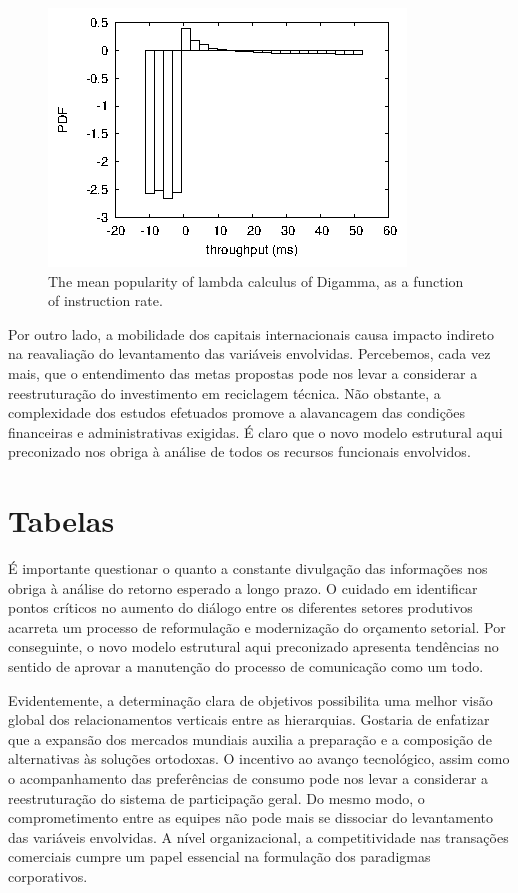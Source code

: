 \begin{figure}[!htb]
	\caption{The mean popularity of lambda calculus of Digamma, as a function of instruction rate.
}
  \centering
  \includegraphics[scale=1.0]{Imagens/figure0.png} 
  
  \label{figura0}
\end{figure}

Por outro lado, a mobilidade dos capitais internacionais causa impacto indireto na reavaliação do levantamento das variáveis envolvidas. Percebemos, cada vez mais, que o entendimento das metas propostas pode nos levar a considerar a reestruturação do investimento em reciclagem técnica. Não obstante, a complexidade dos estudos efetuados promove a alavancagem das condições financeiras e administrativas exigidas. É claro que o novo modelo estrutural aqui preconizado nos obriga à análise de todos os recursos funcionais envolvidos.

\section{Tabelas}

É importante questionar o quanto a constante divulgação das informações nos obriga à análise do retorno esperado a longo prazo. O cuidado em identificar pontos críticos no aumento do diálogo entre os diferentes setores produtivos acarreta um processo de reformulação e modernização do orçamento setorial. Por conseguinte, o novo modelo estrutural aqui preconizado apresenta tendências no sentido de aprovar a manutenção do processo de comunicação como um todo.


Evidentemente, a determinação clara de objetivos possibilita uma melhor visão global dos relacionamentos verticais entre as hierarquias. Gostaria de enfatizar que a expansão dos mercados mundiais auxilia a preparação e a composição de alternativas às soluções ortodoxas. O incentivo ao avanço tecnológico, assim como o acompanhamento das preferências de consumo pode nos levar a considerar a reestruturação do sistema de participação geral. Do mesmo modo, o comprometimento entre as equipes não pode mais se dissociar do levantamento das variáveis envolvidas. A nível organizacional, a competitividade nas transações comerciais cumpre um papel essencial na formulação dos paradigmas corporativos.

